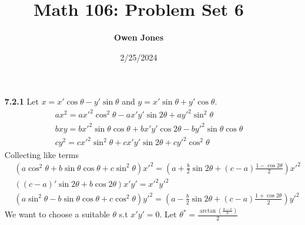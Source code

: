 \documentclass[10pt]{article}
\title{\bf Math 106: Problem Set 6}
\date{2/25/2024}
\author{\bf Owen Jones}
\begin{document}
\begin{enumerate}
    \item [\textbf{7.2.1}] Let $x=x'\cos\theta-y'\sin\theta$ and $y=x'\sin\theta+y'\cos\theta$.
    \begin{align*}
        &ax^2=a{x'}^2\cos^2\theta-ax'y'\sin2\theta+a{y'}^2\sin^2\theta\\
        &bxy=b{x'}^2\sin\theta\cos\theta+bx'y'\cos2\theta-b{y'}^2\sin\theta\cos\theta\\
        &cy^2=c{x'}^2\sin^2\theta+cx'y'\sin2\theta+c{y'}^2\cos^2\theta
    \end{align*}
    Collecting like terms
    \begin{align*}
        &(a\cos^2\theta+b\sin\theta\cos\theta+c\sin^2\theta){x'}^2=(a+\frac{b}{2}\sin2\theta+(c-a)\frac{1-\cos2\theta}{2}){x'}^2\\
        &((c-a)'\sin2\theta+b\cos2\theta)x'y'={x'}^2{y'}^2\\
        &(a\sin^2\theta-b\sin\theta\cos\theta+c\cos^2\theta){y'}^2=(a-\frac{b}{2}\sin2\theta+(c-a)\frac{1+\cos2\theta}{2}){y'}^2
    \end{align*}
        We want to choose a suitable $\theta$ s.t $x'y'=0$. Let $\theta^*=\frac{\arctan(\frac{a-c}{b})}{2}$


\end{enumerate}
\end{document}
